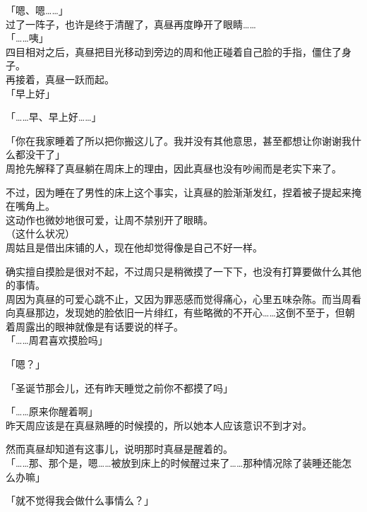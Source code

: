「嗯、嗯……」\\

过了一阵子，也许是终于清醒了，真昼再度睁开了眼睛……\\

「……咦」\\

四目相对之后，真昼把目光移动到旁边的周和他正碰着自己脸的手指，僵住了身子。\\

再接着，真昼一跃而起。\\

「早上好」

「……早、早上好……」

「你在我家睡着了所以把你搬这儿了。我并没有其他意思，甚至都想让你谢谢我什么都没干了」\\

周抢先解释了真昼躺在周床上的理由，因此真昼也没有吵闹而是老实下来了。

不过，因为睡在了男性的床上这个事实，让真昼的脸渐渐发红，捏着被子提起来掩在嘴角上。\\

这动作也微妙地很可爱，让周不禁别开了眼睛。\\

（这什么状况）\\

周姑且是借出床铺的人，现在他却觉得像是自己不好一样。

确实擅自摸脸是很对不起，不过周只是稍微摸了一下下，也没有打算要做什么其他的事情。\\

周因为真昼的可爱心跳不止，又因为罪恶感而觉得痛心，心里五味杂陈。而当周看向真昼那边，发现她的脸依旧一片绯红，有些略微的不开心……这倒不至于，但朝着周露出的眼神就像是有话要说的样子。\\

「……周君喜欢摸脸吗」

「嗯？」

「圣诞节那会儿，还有昨天睡觉之前你不都摸了吗」

「……原来你醒着啊」\\

昨天周应该是在真昼熟睡的时候摸的，所以她本人应该意识不到才对。

然而真昼却知道有这事儿，说明那时真昼是醒着的。\\

「……那、那个是，嗯……被放到床上的时候醒过来了……那种情况除了装睡还能怎么办嘛」

「就不觉得我会做什么事情么？」

